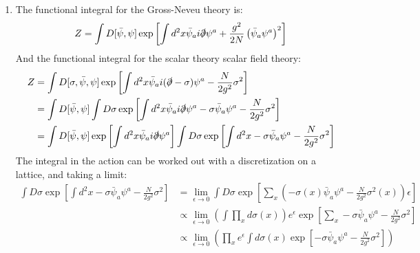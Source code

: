 \documentclass[12pt,a4]{article}
\begin{document}
\begin{enumerate}
\begin{enumerate}
      \item
        The functional integral for the Gross-Neveu theory is:
        \begin{align*}
          Z = \int D[\bar{\psi}, \psi]  \exp\left[\int d^2x \bar{\psi}_a i \slashed{\partial} \psi^a + \frac{g^2}{2N} \left(\bar{\psi}_a \psi^a\right)^2\right]
        \end{align*}
        And the functional integral for the scalar theory scalar field theory:
        \begin{align*}
          Z &= \int D[\sigma, \bar{\psi}, \psi] \exp\left[\int d^2x \bar{\psi}_a i (\slashed{\partial} - \sigma ) \psi^a - \frac{N}{2g^2} \sigma^2\right]\\
            &= \int D[\bar{\psi}, \psi] \int D \sigma \exp\left[\int d^2x \bar{\psi}_a i \slashed{\partial} \psi^a - \sigma \bar{\psi}_a \psi^a  - \frac{N}{2g^2}\sigma^2 \right]\\
            &= \int D[\bar{\psi}, \psi] \exp\left[\int d^2x \bar{\psi}_a i \slashed{\partial} \psi^a \right] \int D \sigma \exp\left[\int d^2x - \sigma \bar{\psi}_a \psi^a  - \frac{N}{2g^2}\sigma^2 \right]
        \end{align*}
        The integral in the action can be worked out with a discretization on a lattice, and taking a limit:
        \begin{align*}
          \int D \sigma \exp\left[\int d^2x - \sigma \bar{\psi}_a \psi^a  - \frac{N}{2g^2}\sigma^2 \right] &= \lim_{\epsilon \to 0 } \int D \sigma \exp\left[\sum_x \left(- \sigma(x) \bar{\psi}_a \psi^a  - \frac{N}{2g^2}\sigma^2(x) \right) \epsilon\right] \\ 
                                                                                                           &\propto \lim_{\epsilon \to 0 } \left(\int \prod_x  d \sigma(x)\right) e^\epsilon\exp\left[\sum_x - \sigma \bar{\psi}_a \psi^a  - \frac{N}{2g^2}\sigma^2 \right] \\ 
                                                                                                           &\propto \lim_{\epsilon \to 0 } \left(\prod_x e^\epsilon \int   d \sigma(x) \exp\left[- \sigma \bar{\psi}_a \psi^a  - \frac{N}{2g^2}\sigma^2 \right] \right)

\end{align*}
\end{enumerate}
\end{enumerate}
\end{document}
